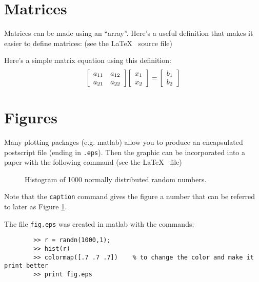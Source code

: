 	\section{Matrices}
	
	Matrices can be made using an ``array''.  Here's a useful definition that 
	makes it easier to define matrices:  (see the \LaTeX~ source file)
	\newenvironment{mat}{\left[\begin{array}{ccccccccccccc}}{\end{array}\right]}
	
	Here's a simple matrix equation using this definition:
	\begin{equation}
		\begin{mat} a_{11} & a_{12} \\ a_{21} & a_{22} \end{mat}
		\begin{mat} x_1\\ x_2 \end{mat}
		= \begin{mat} b_1\\ b_2 \end{mat}
		\label{matrixequation}
	\end{equation}
	
	\section{Figures}
	Many plotting packages (e.g. matlab) allow you to produce an encapsulated
	postscript file (ending in {\tt .eps}).   Then the graphic can be incorporated
	into a paper with the following command (see the \LaTeX~ file)
	
	\begin{figure}
		\caption{\label{figlabel} Histogram of 1000 normally distributed random
			numbers.}
	\end{figure}
	
	Note that the {\tt caption} command gives the figure a number that can be referred
	to later as Figure \ref{figlabel}.
	
	The file {\tt fig.eps} was created in matlab with the commands:
	\begin{verbatim}
		>> r = randn(1000,1);
		>> hist(r)             
		>> colormap([.7 .7 .7])    % to change the color and make it print better
		>> print fig.eps
	\end{verbatim}
	
	
